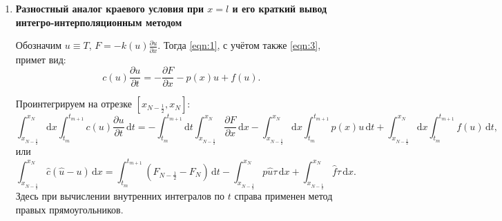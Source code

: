 \documentclass[a4paper,oneside,12pt]{extreport}
\begin{document}
\begin{enumerate}
	\item \textbf{Разностный аналог краевого условия при $x=l$ и его краткий вывод интегро-интерполяционным методом}

	Обозначим $u\equiv T$, $\displaystyle F=-k(u)\frac{\partial u}{\partial x}$.
	Тогда \eqref{eqn:1}, с учётом также \eqref{eqn:3}, примет вид:
	\begin{equation}
		c(u)\frac{\partial u}{\partial t} = -\frac{\partial F}{\partial x} - p(x)u + f(u).
	\end{equation}

	Проинтегрируем на отрезке $[x_{N-\frac12}, x_N]$:
	\begin{equation*}
		\int_{x_{N-\frac12}}^{x_N} \!\!\!\!\!\mathrm dx \int_{t_m}^{t_{m+1}}\!\!\! c(u)\frac{\partial u}{\partial t}\,\mathrm dt
		=
		-\int_{t_m}^{t_{m+1}} \!\!\!\!\!\mathrm dt \int_{x_{N-\frac12}}^{x_N}\!\!\! \frac{\partial F}{\partial x} \,\mathrm dx
		-\int_{x_{N-\frac12}}^{x_N} \!\!\!\!\!\mathrm dx \int_{t_m}^{t_{m+1}}\!\!\! p(x) u \,\mathrm dt
		+\int_{x_{N-\frac12}}^{x_N} \!\!\!\!\!\mathrm dx \int_{t_m}^{t_{m+1}}\!\!\! f(u) \,\mathrm dt,
	\end{equation*}
	или
	\begin{equation*}
	\int_{x_{N-\frac12}}^{x_N} \!\!\! \widehat c(\widehat u - u)\,\mathrm dx
	=
	\int_{t_m}^{t_{m+1}} \!\!\! (F_{N-\frac12}-F_N)\,\mathrm dt
	-\int_{x_{N-\frac12}}^{x_N} \!\!\! p \widehat u \tau \,\mathrm dx
	+\int_{x_{N-\frac12}}^{x_N} \!\!\! \widehat f \tau \,\mathrm dx.
	\end{equation*}
	Здесь при вычислении внутренних интегралов по $t$ справа применен метод правых прямоугольников.


\end{enumerate}
\end{document}
